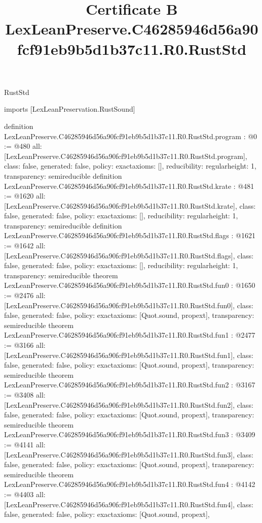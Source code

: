\begin{lexlean}{RustStd}
\title{Certificate B LexLeanPreserve.C46285946d56a90fcf91eb9b5d1b37c11.R0.RustStd}
\begin{coremodule}
imports [LexLeanPreservation.RustSound]

definition LexLeanPreserve.C46285946d56a90fcf91eb9b5d1b37c11.R0.RustStd.program : @0 := @480 {
  all: [LexLeanPreserve.C46285946d56a90fcf91eb9b5d1b37c11.R0.RustStd.program],
  class: false,
  generated: false,
  policy: exact{axioms: []},
  reducibility: regular{height: 1},
  transparency: semireducible
}
definition LexLeanPreserve.C46285946d56a90fcf91eb9b5d1b37c11.R0.RustStd.krate : @481 := @1620 {
  all: [LexLeanPreserve.C46285946d56a90fcf91eb9b5d1b37c11.R0.RustStd.krate],
  class: false,
  generated: false,
  policy: exact{axioms: []},
  reducibility: regular{height: 1},
  transparency: semireducible
}
definition LexLeanPreserve.C46285946d56a90fcf91eb9b5d1b37c11.R0.RustStd.flags : @1621 := @1642 {
  all: [LexLeanPreserve.C46285946d56a90fcf91eb9b5d1b37c11.R0.RustStd.flags],
  class: false,
  generated: false,
  policy: exact{axioms: []},
  reducibility: regular{height: 1},
  transparency: semireducible
}
theorem LexLeanPreserve.C46285946d56a90fcf91eb9b5d1b37c11.R0.RustStd.fun0 : @1650 := @2476 {
  all: [LexLeanPreserve.C46285946d56a90fcf91eb9b5d1b37c11.R0.RustStd.fun0],
  class: false,
  generated: false,
  policy: exact{axioms: [Quot.sound, propext]},
  transparency: semireducible
}
theorem LexLeanPreserve.C46285946d56a90fcf91eb9b5d1b37c11.R0.RustStd.fun1 : @2477 := @3166 {
  all: [LexLeanPreserve.C46285946d56a90fcf91eb9b5d1b37c11.R0.RustStd.fun1],
  class: false,
  generated: false,
  policy: exact{axioms: [Quot.sound, propext]},
  transparency: semireducible
}
theorem LexLeanPreserve.C46285946d56a90fcf91eb9b5d1b37c11.R0.RustStd.fun2 : @3167 := @3408 {
  all: [LexLeanPreserve.C46285946d56a90fcf91eb9b5d1b37c11.R0.RustStd.fun2],
  class: false,
  generated: false,
  policy: exact{axioms: [Quot.sound, propext]},
  transparency: semireducible
}
theorem LexLeanPreserve.C46285946d56a90fcf91eb9b5d1b37c11.R0.RustStd.fun3 : @3409 := @4141 {
  all: [LexLeanPreserve.C46285946d56a90fcf91eb9b5d1b37c11.R0.RustStd.fun3],
  class: false,
  generated: false,
  policy: exact{axioms: [Quot.sound, propext]},
  transparency: semireducible
}
theorem LexLeanPreserve.C46285946d56a90fcf91eb9b5d1b37c11.R0.RustStd.fun4 : @4142 := @4403 {
  all: [LexLeanPreserve.C46285946d56a90fcf91eb9b5d1b37c11.R0.RustStd.fun4],
  class: false,
  generated: false,
  policy: exact{axioms: [Quot.sound, propext]},
}
\end{coremodule}
\end{lexlean}
